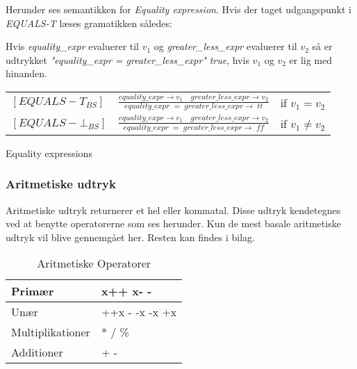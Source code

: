 
\noindent Herunder ses semantikken for \textit{Equality expression}. Hvis der taget udgangspunkt i \textit{EQUALS-T} læses gramatikken således: 

\noindent Hvis \textit{equality\_expr} evaluerer til $v_1$ og \textit{greater\_less\_expr} evaluerer til $v_2$ så er udtrykket \textit{"equality\_expr = greater\_less\_expr"} \textit{true}, hvis $v_1$ og $v_2$ er lig med hinanden.

\begin{semantik}
    \bgroup
    \def\arraystretch{3}
    \begin{table}[H]
    \centering
    \begin{tabular}{l c l}
        
        $[EQUALS-T_{BS}]$ &$\frac{equality\_expr \rightarrow v_1 \quad greater\_less\_expr \rightarrow v_2}{equality\_expr\;=\;greater\_less\_expr \rightarrow \; tt}$ & if $v_1 = v_2$ \\
        
        $[EQUALS-\bot_{BS}]$ &$\frac{equality\_expr \rightarrow v_1 \quad greater\_less\_expr \rightarrow v_2}{equality\_expr\;=\;greater\_less\_expr \rightarrow \; ff}$ & if $v_1 \ne v_2$ \\
        
    \end{tabular}
    \end{table}
    \egroup
    \caption{Equality expressions}
    \label{sem:equalityExpr}
\end{semantik}
\subsubsection{Aritmetiske udtryk}
Aritmetiske udtryk returnerer et hel eller kommatal. Disse udtryk kendetegnes ved at benytte operatorerne som ses herunder. Kun de mest basale aritmetiske udtryk vil blive gennemgået her. Resten kan findes i bilag.


\begin{table}[H]
    \centering
    \begin{tabular}{|l|l|}
        \hline
        \centering

        Primær             & x++ \quad x- -                                    \\ \hline
        Unær               & ++x \quad - -x \quad -x \quad +x                   \\ \hline
        Multiplikationer   & * \quad / \quad \%                                \\ \hline
        Additioner         & + \quad -                                         \\ \hline

    \end{tabular}
    \caption{Aritmetiske Operatorer}
    \label{tab:aritmetiskeOperatorer}
\end{table}

